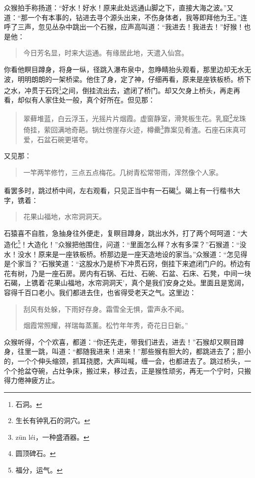 \documentclass[12pt,UTF8]{ctexbook}
\begin{document}
众猴拍手称扬道：“好水！好水！原来此处远通山脚之下，直接大海之波。”又道：“那一个有本事的，钻进去寻个源头出来，不伤身体者，我等即拜他为王。”连呼了三声，忽见丛杂中跳出一个石猴，应声高叫道：“我进去！我进去！”好猴！也是他：

\begin{quotation}
今日芳名显，时来大运通。有缘居此地，天遣入仙宫。
\end{quotation}

你看他瞑目蹲身，将身一纵，径跳入瀑布泉中，忽睁睛抬头观看，那里边却无水无波，明明朗朗的一架桥梁。他住了身，定了神，仔细再看，原来是座铁板桥。桥下之水，冲贯于石窍\footnote{石洞。}之间，倒挂流出去，遮闭了桥门。却又欠身上桥头，再走再看，却似有人家住处一般，真个好所在。但见那：

\begin{quotation}
翠藓堆蓝，白云浮玉，光摇片片烟霞。虚窗静室，滑凳板生花。乳窟\footnote{生长有钟乳石的洞穴。}龙珠倚挂，萦回满地奇葩。锅灶傍崖存火迹，樽罍\footnote{z\=un l\'ei，一种盛酒器。}靠案见肴渣。石座石床真可爱，石盆石碗更堪夸。
\end{quotation}

又见那：

\begin{quotation}
一竿两竿修竹，三点五点梅花。几树青松常带雨，浑然像个人家。
\end{quotation}

看罢多时，跳过桥中间，左右观看，只见正当中有一石碣\footnote{圆顶碑石。}。碣上有一行楷书大字，镌着：

\begin{quotation}
花果山福地，水帘洞洞天。
\end{quotation}

石猿喜不自胜，急抽身往外便走，复瞑目蹲身，跳出水外，打了两个呵呵道：“大造化\footnote{福分，运气。}！大造化！”众猴把他围住，问道：“里面怎么样？水有多深？”石猴道：“没水！没水！原来是一座铁板桥。桥那边是一座天造地设的家当。”众猴道：“怎见得是个家当？”石猴笑道：“这股水乃是桥下冲贯石窍，倒挂下来遮闭门户的。桥边有花有树，乃是一座石房。房内有石锅、石灶、石碗、石盆、石床、石凳，中间一块石碣，上镌着‘花果山福地，水帘洞洞天’，真个是我们安身之处。里面且是宽阔，容得千百口老小。我们都进去住，也省得受老天之气。这里边：

\begin{quotation}
刮风有处躲，下雨好存身。霜雪全无惧，雷声永不闻。

烟霞常照耀，祥瑞每蒸薰。松竹年年秀，奇花日日新。”

\end{quotation}
众猴听得，个个欢喜，都道：“你还先走，带我们进去，进去！”石猴却又瞑目蹲身，往里一跳，叫道：“都随我进来！进来！”那些猴有胆大的，都跳进去了；胆小的，一个个伸头缩颈，抓耳挠腮，大声叫喊，缠一会，也都进去了。跳过桥头，一个个抢盆夺碗，占灶争床，搬过来，移过去，正是猴性顽劣，再无一个宁时，只搬得力倦神疲方止。
\end{document}
